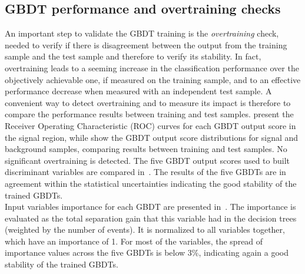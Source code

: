\subsection {GBDT performance and overtraining checks }
An important step to validate the GBDT training is the \textit{overtraining} check, needed to 
verify if there is disagreement between the output from the training sample and the test sample and therefore to 
verify its stability. In fact, overtraining  leads  to  a  seeming  increase  in  the  classification 
performance  over  the objectively  achievable  one,  if  measured  on  the  training  sample, 
 and  to  an  effective performance decrease when measured with an independent test sample.
A convenient way to detect overtraining and to measure its impact is therefore to compare the
performance results between training and test samples. 
present the Receiver Operating  Characteristic (ROC) curves for each GBDT output score in
the signal region, while  show
the GBDT output score distributions for signal and background samples, comparing results
between training and test samples.
No significant overtraining is detected. The five GBDT output scores used to
built discriminant variables are compared in~. 
The results of the five GBDTs are in agreement within the statistical uncertainties indicating the 
good stability of the trained GBDTs.
\\Input variables importance for each GBDT are presented in~. The importance is evaluated as the total separation gain that this variable had in the decision trees (weighted by the number of events). It is normalized to all variables together, which have an importance of 1.
For most of the variables, the spread of importance values across the five GBDTs is below 3\%, indicating again a good stability of the trained GBDTs.
